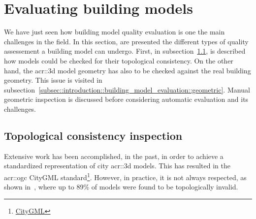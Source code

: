 \section{Evaluating building models}
    \label{sec::introduction::building_model_evaluation}
    We have just seen how building model quality evaluation is one the main challenges in the field.
    In this section, are presented the different types of quality assessement a building model can undergo.
    First, in subsection~\ref{subsec::introduction::building_model_evaluation::topological}, is described how models could be checked for their topological consistency.
    On the other hand, the \gls{acr::3d} model geometry has also to be checked against the real building geometry.
    This issue is visited in subsection~\ref{subsec::introduction::building_model_evaluation::geometric}.
    Manual geometric inspection is discussed before considering automatic evaluation and its challenges.

    \subsection{Topological consistency inspection}
        \label{subsec::introduction::building_model_evaluation::topological}
        Extensive work has been accomplished, in the past, in order to achieve a standardized representation of city \gls{acr::3d} models.
        This has resulted in the \gls{acr::ogc} CityGML standard\footnote{\href{https://www.opengeospatial.org/standards/citygml}{CityGML}}.
        However, in practice, it is not always respected, as shown in~\textcite{biljecki2016most}, where up to 89\% of models were found to be topologically invalid.\\

